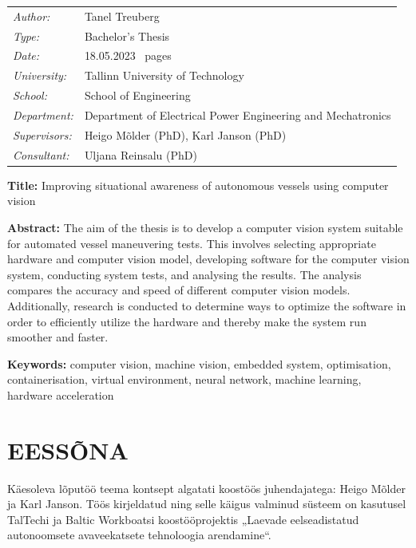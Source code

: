 \documentclass[12pt,a4paper]{report}
\begin{document}
\noindent
\begin{tabular}{@{}ll@{}}
  \emph{Author:}     & Tanel Treuberg \\
  \emph{Type:}       & Bachelor's Thesis \\
  \emph{Date:}       & 18.05.2023 \quad 58~pages \\
  \emph{University:} & Tallinn University of Technology \\
  \emph{School:}     & School of Engineering \\
  \emph{Department:} & Department of Electrical Power Engineering and Mechatronics \\
  \emph{Supervisors:}& Heigo Mõlder (PhD), Karl Janson (PhD) \\
  \emph{Consultant:} & Uljana Reinsalu (PhD) \\
\end{tabular}

\vspace{0.5em}
\noindent\textbf{Title:} Improving situational awareness of autonomous vessels using
computer vision

\vspace{0.5em}
\noindent\textbf{Abstract:} The aim of the thesis is to develop a computer vision system
suitable for automated vessel maneuvering tests. This involves selecting appropriate hardware
and computer vision model, developing software for the computer vision system, conducting
system tests, and analysing the results. The analysis compares the accuracy and speed of
different computer vision models. Additionally, research is conducted to determine ways to
optimize the software in order to efficiently utilize the hardware and thereby make the system
run smoother and faster.

\vspace{0.5em}
\noindent\textbf{Keywords:} computer vision, machine vision, embedded system, optimisation,
containerisation, virtual environment, neural network, machine learning, hardware acceleration

\tableofcontents
\listoffigures
\listoftables

\section*{EESSÕNA}\label{eessuxf5na}

Käesoleva lõputöö teema kontsept algatati koostöös juhendajatega: Heigo Mõlder ja Karl Janson. Töös kirjeldatud ning selle käigus valminud süsteem on kasutusel TalTechi ja Baltic Workboatsi koostööprojektis „Laevade eelseadistatud autonoomsete avaveekatsete tehnoloogia arendamine``.
\end{document}

